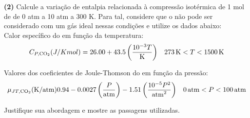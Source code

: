 \textbf{(2)} Calcule a variação de entalpia relacionada à compressão isotérmica
de 1 mol de  de 0 atm a 10 atm a 300 K. Para tal, considere que o
 não pode ser considerado com um gás ideal nessas condições e utilize os
dados abaixo:\\

Calor específico do  em função da temperatura:
\begin{align*}
    C_{P, \ce{CO2}} (J / K mol) = \num{26.00} + \num{43.5} \left(\frac{10^{-3}
    T}{\unit{K}}\right) && \qty{273}{K} < T < \qty{1500}{K}
\end{align*}

Valores dos coeficientes de Joule-Thomson do  em função da pressão:
\begin{align*}
    \mu_{JT, \ce{CO2}} (\unit{K} / \unit{atm}) \num{0.94} - \num{0.0027} \left(
    \frac{P}{\unit{atm}} \right) - \num{1.51} \left( \frac{10^{-5}
    P^2}{\unit{atm}^2} \right) && \qty{0}{atm} < P < \qty{100}{atm}
\end{align*}

Justifique sua abordagem e mostre as passagens utilizadas.\\
